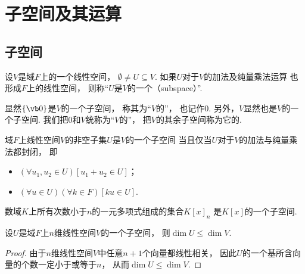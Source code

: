 \section{子空间及其运算}
\subsection{子空间}
\begin{definition}
设\(V\)是域\(F\)上的一个线性空间，
\(\emptyset\neq U\subseteq V\).
如果\(U\)对于\(V\)的加法及纯量乘法运算
也形成\(F\)上的线性空间，
则称“\(U\)是\(V\)的一个（subspace）”.
\end{definition}

显然\(\{\vb0\}\)是\(V\)的一个子空间，
称其为“\(V\)的”，
也记作\(0\).
另外，\(V\)显然也是\(V\)的一个子空间.
我们把\(0\)和\(V\)统称为“\(V\)的”，
把\(V\)的其余子空间称为它的.

\begin{theorem}\label{theorem:线性空间.子空间的判定}
域\(F\)上线性空间\(V\)的非空子集\(U\)是\(V\)的一个子空间
当且仅当\(U\)对于\(V\)的加法与纯量乘法都封闭，
即\begin{itemize}
	\item \((\forall u_1,u_2\in U)[u_1+u_2 \in U]\)；
	\item \((\forall u\in U)(\forall k\in F)[ku\in U]\).
\end{itemize}
\end{theorem}

\begin{example}
数域\(K\)上所有次数小于\(n\)的一元多项式组成的集合\(K[x]_n\)
是\(K[x]\)的一个子空间.
\end{example}

\begin{proposition}
设\(U\)是域\(F\)上\(n\)维线性空间\(V\)的一个子空间，
则\(\dim U\leq\dim V\).
\begin{proof}
由于\(n\)维线性空间\(V\)中任意\(n+1\)个向量都线性相关，
因此\(U\)的一个基所含向量的个数一定小于或等于\(n\)，
从而\(\dim U\leq\dim V\).
\end{proof}
\end{proposition}

